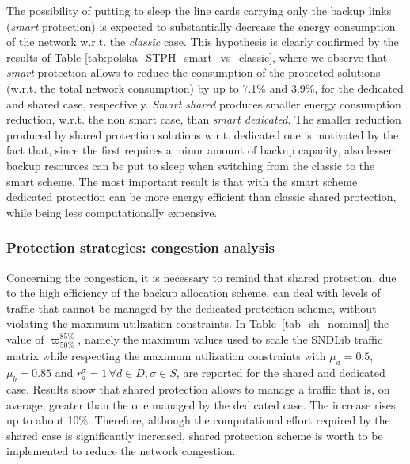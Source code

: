 \documentclass[final,5p,times,twocolumn]{elsarticle}
\begin{document}
The possibility of putting to sleep the line cards carrying only the backup links (\textit{smart} protection) is expected to substantially decrease the energy consumption of the network w.r.t. the \textit{classic} case. This hypothesis is clearly confirmed by the results of Table \ref{tab:polska_STPH_smart_vs_classic}, where we observe that \textit{smart} protection allows to reduce the consumption of the protected solutions (w.r.t. the total network consumption) by up to 7.1\% and 3.9\%, for the dedicated and shared case, respectively. \textit{Smart shared} produces smaller energy consumption reduction, w.r.t. the non smart case, than \textit{smart dedicated}.
The smaller reduction produced by shared protection solutions w.r.t. dedicated one is motivated by the fact that, since the first requires a minor amount of backup capacity, also lesser backup resources can be put to sleep when switching from the classic to the smart scheme. The most important result is that with the smart scheme dedicated protection can be more energy efficient than classic shared protection, while being less computationally expensive. 

\subsubsection{Protection strategies: congestion analysis}
Concerning the congestion, it is necessary to remind that shared protection, due to the high efficiency of the backup allocation scheme, can deal with levels of traffic that cannot be managed by the dedicated protection scheme, without violating  the maximum utilization constraints. In Table~\ref{tab_sh_nominal} the value of $\varpi_{50\%}^{85\%}$, namely the maximum values used to scale the SNDLib traffic matrix while respecting the maximum utilization constraints with $\mu_a =0.5$, $\mu_b=0.85$ and $r_d^{\sigma} = 1\, \forall d \in D, \sigma \in S$, are reported for the shared and dedicated case. Results show that shared protection allows to manage a traffic that is, on average, greater than the one managed by the dedicated case. The increase rises up to about 10\%. Therefore,  although the computational effort required by the shared case is significantly increased, shared protection scheme is worth to be implemented to reduce the network congestion. 
\end{document}
